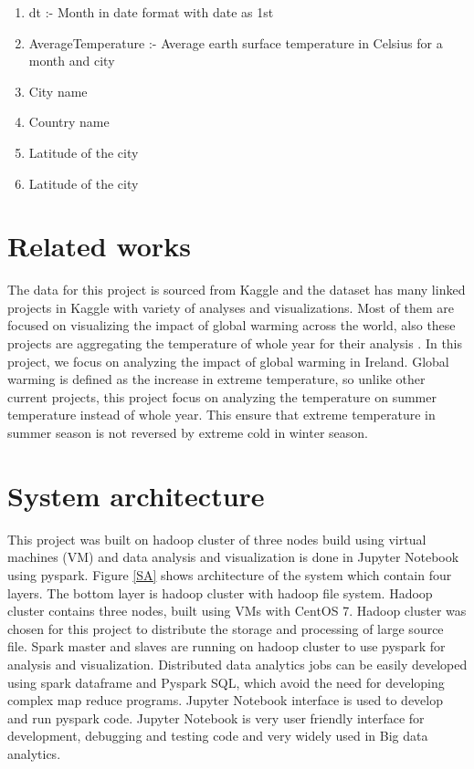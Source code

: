 \documentclass[journal,twoside,web]{ieeecolor}
\begin{document}
\begin{enumerate}
\item dt :- Month in date format with date as 1st
\item AverageTemperature :-  Average earth surface temperature in Celsius for a month and city
\item City name
\item Country name 
\item Latitude of the city
\item Latitude of the city
\end{enumerate}

\section{Related works}
The data for this project is sourced from Kaggle and the dataset has many linked projects in Kaggle with variety of analyses and visualizations. Most of them are focused on visualizing the impact of global warming across the world, also these projects are aggregating the temperature of whole year for their analysis \cite{RW}.  In this project, we focus on analyzing the impact of global warming in Ireland.  Global warming is defined as the increase in extreme temperature, so unlike other current projects, this project focus on analyzing the temperature on summer temperature instead of whole year.  This ensure that extreme temperature in summer season is not reversed by extreme cold in winter season.

\section{System architecture}
This project was built on hadoop cluster of three nodes build using virtual machines (VM) and data analysis and visualization is done in Jupyter Notebook using pyspark.  Figure \ref{SA} shows architecture of the system which contain four layers.  The bottom layer is hadoop cluster with hadoop file system.  Hadoop cluster contains three nodes, built using VMs with CentOS 7.  Hadoop cluster was chosen for this project to distribute the storage and processing of large source file.  Spark master and slaves are running on hadoop cluster to use pyspark for analysis and visualization.  Distributed data analytics jobs can be easily developed using spark dataframe and Pyspark SQL, which avoid the need for developing complex map reduce programs.  Jupyter Notebook interface is used to develop and run pyspark code.  Jupyter Notebook is very user friendly interface for development, debugging and testing code and very widely used in Big data analytics.
\end{document}
